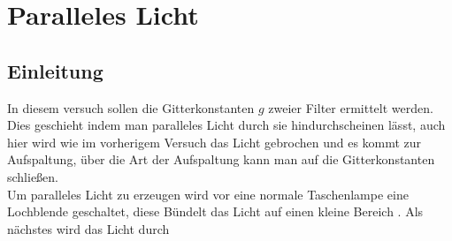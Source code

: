 \section{Paralleles Licht}

\subsection{Einleitung}
In diesem versuch sollen die Gitterkonstanten $g$ zweier Filter ermittelt werden. Dies geschieht indem man paralleles Licht durch sie hindurchscheinen lässt,
auch hier wird wie im vorherigem Versuch das Licht gebrochen und es kommt zur Aufspaltung, über die Art der Aufspaltung kann man auf die Gitterkonstanten schließen. \\
Um paralleles Licht zu erzeugen wird vor eine normale Taschenlampe eine Lochblende geschaltet, diese Bündelt das Licht auf einen kleine Bereich . Als nächstes wird das
Licht durch 